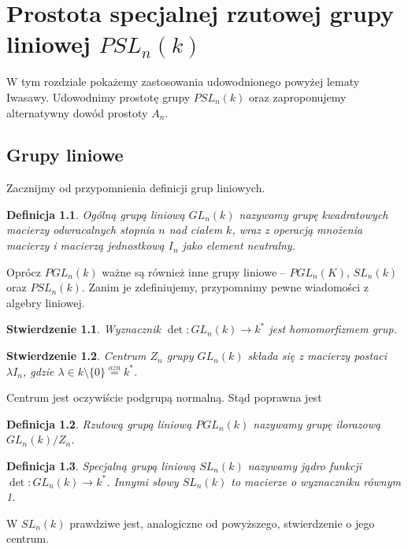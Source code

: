 \documentclass[licencjacka]{pracamgr}
\newtheorem{deff}{Definicja}[section]
\newtheorem{fact}{Stwierdzenie}[section]
\begin{document}
\chapter{Prostota specjalnej rzutowej grupy liniowej $PSL_n(k)$}

W tym rozdziale pokażemy zastosowania udowodnionego powyżej lematy Iwasawy.
Udowodnimy prostotę grupy $PSL_n(k)$ oraz zaproponujemy alternatywny dowód prostoty $A_n$.

\section{Grupy liniowe}

Zacznijmy od przypomnienia definicji grup liniowych.

\begin{deff}
  \emph{Ogólną grupą liniową $GL_n(k)$} nazywamy grupę kwadratowych macierzy odwracalnych 
  stopnia $n$ nad ciałem $k$, wraz z operacją mnożenia macierzy i macierzą jednostkową $I_n$
  jako element neutralny.
\end{deff}

Oprócz $PGL_n(k)$ ważne są również inne grupy liniowe -- $PGL_n(K)$, $SL_n(k)$ oraz $PSL_n(k)$.
Zanim je zdefiniujemy, przypomnimy pewne wiadomości z algebry liniowej.

\begin{fact}
  Wyznacznik $\det \colon GL_n(k) \to k^*$ jest homomorfizmem grup.
\end{fact}

\begin{fact}
  Centrum $Z_n$ grupy $GL_n(k)$ składa się z macierzy postaci $\lambda I_n$, 
  gdzie $\lambda \in k \setminus \{0\} \stackrel{ozn}{=} k^*$.
\end{fact}

Centrum jest oczywiście podgrupą normalną. Stąd poprawna jest

\begin{deff}
  \emph{Rzutową grupą liniową $PGL_n(k)$} nazywamy grupę ilorazową $GL_n(k) / Z_n$.
\end{deff}

\begin{deff}
  \emph{Specjalną grupą liniową $SL_n(k)$} nazywamy jądro funkcji $\det \colon GL_n(k) \to k^*$.
  Innymi słowy $SL_n(k)$ to macierze o wyznaczniku równym 1.
\end{deff}

W $SL_n(k)$ prawdziwe jest, analogiczne od powyższego, stwierdzenie o jego centrum.
\end{document}
